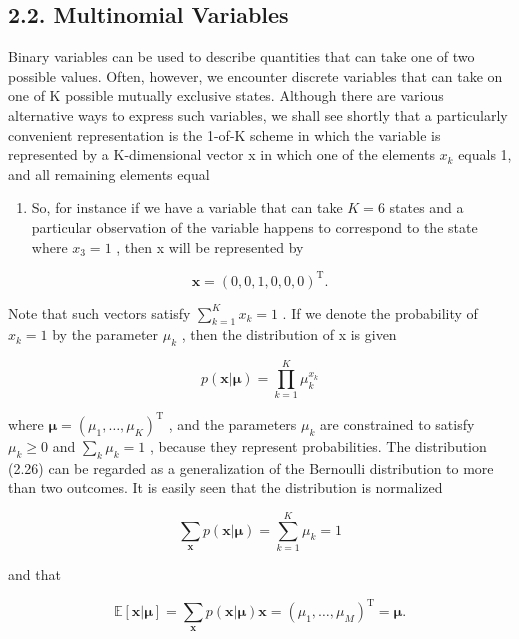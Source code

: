 \documentclass[
  10
]{article}
\providecommand{\tightlist}{%
  \setlength{\itemsep}{0pt}\setlength{\parskip}{0pt}}
\begin{document}
\subsection{2.2. Multinomial Variables}\label{multinomial-variables}

Binary variables can be used to describe quantities that can take one of
two possible values. Often, however, we encounter discrete variables
that can take on one of K possible mutually exclusive states. Although
there are various alternative ways to express such variables, we shall
see shortly that a particularly convenient representation is the 1-of-K
scheme in which the variable is represented by a K-dimensional vector x
in which one of the elements \(x _ { k }\) equals 1, and all remaining
elements equal

\begin{enumerate}
\def\labelenumi{\arabic{enumi}.}
\setcounter{enumi}{-1}
\tightlist
\item
  So, for instance if we have a variable that can take \(K = 6\) states
  and a particular observation of the variable happens to correspond to
  the state where \(x _ { 3 } = 1\) , then x will be represented by
\end{enumerate}

\[
\mathbf {x} = (0, 0, 1, 0, 0, 0) ^ {\mathrm{T}}.\tag{2.25}
\]

Note that such vectors satisfy
\(\textstyle \sum _ { k = 1 } ^ { K } x _ { k } = 1\) . If we denote the
probability of \(x _ { k } = 1\) by the parameter \(\mu _ { k }\) , then
the distribution of x is given

\[
p (\mathbf {x} | \boldsymbol {\mu}) = \prod_ {k = 1} ^ {K} \mu_ {k} ^ {x _ {k}}\tag{2.26}
\]

where
\(\pmb { \mu } = ( \mu _ { 1 } , \ldots , \mu _ { K } ) ^ { \mathrm { T } }\)
, and the parameters \(\mu _ { k }\) are constrained to satisfy
\(\mu _ { k } \geqslant 0\) and
\(\textstyle \sum _ { k } \mu _ { k } = 1\) , because they represent
probabilities. The distribution (2.26) can be regarded as a
generalization of the Bernoulli distribution to more than two outcomes.
It is easily seen that the distribution is normalized

\[
\sum_ {\mathbf {x}} p (\mathbf {x} | \boldsymbol {\mu}) = \sum_ {k = 1} ^ {K} \mu_ {k} = 1\tag{2.27}
\]

and that

\[
\mathbb {E} [ \mathbf {x} | \boldsymbol {\mu} ] = \sum_ {\mathbf {x}} p (\mathbf {x} | \boldsymbol {\mu}) \mathbf {x} = (\mu_ {1}, \dots , \mu_ {M}) ^ {\mathrm{T}} = \boldsymbol {\mu}.\tag{2.28}
\]
\end{document}
